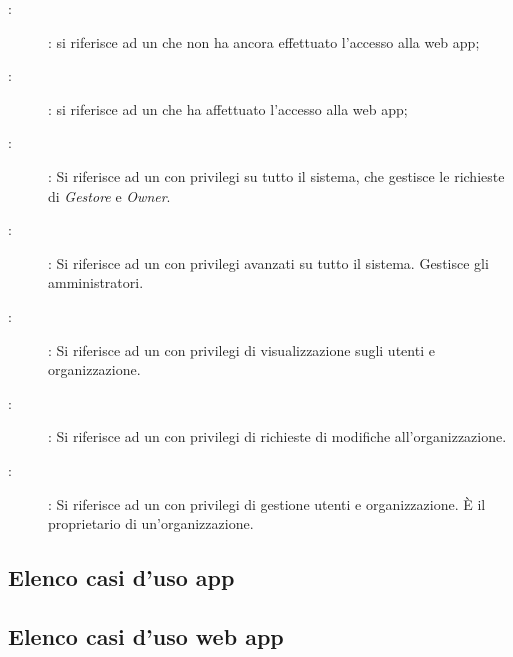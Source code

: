 \documentclass[../analisi-dei-requisiti]{subfiles}
\begin{document}
\begin{description}
  \item[:]: si riferisce ad un  che non ha ancora effettuato l'accesso alla web app;
  \item[:]: si riferisce ad un  che ha affettuato l'accesso alla web app;
  \item[:]: Si riferisce ad un  con privilegi su tutto il sistema, che gestisce le richieste di \emph{Gestore} e \emph{Owner}.
  \item[:]: Si riferisce ad un  con privilegi avanzati su tutto il sistema. Gestisce gli amministratori.
  \item[:]: Si riferisce ad un  con privilegi di visualizzazione sugli utenti e organizzazione.
  \item[:]: Si riferisce ad un  con privilegi di richieste di modifiche all'organizzazione.
  \item[:]: Si riferisce ad un  con privilegi di gestione utenti e organizzazione. È il proprietario di un'organizzazione.
\end{description}


\subsection{Elenco casi d'uso app}%
\label{sub:casi_duso_app}

\subsection{Elenco casi d'uso web app}%
\label{sub:casi_duso_web_app}

\end{document}

